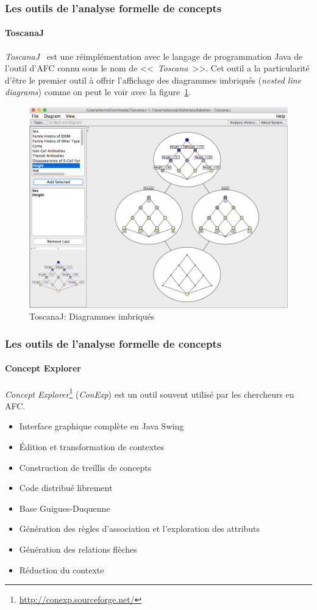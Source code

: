 \documentclass[french]{beamer}
\begin{document}
\begin{frame}
\frametitle{Les outils de l'analyse formelle de concepts}
\framesubtitle{ToscanaJ}
\emph{ToscanaJ}~\parencite{Becker2002} est une réimplémentation avec le langage de programmation Java de l'outil d'AFC connu sous le nom de <<~\emph{Toscana}~>>. Cet outil a la particularité d'être le premier outil à offrir l'affichage des diagrammes imbriqués (\emph{nested line diagrams}) comme on peut le voir avec la figure~\ref{cap:fig:toscanaj-nested}.
\begin{figure}[H]
\caption{ToscanaJ: Diagrammes imbriqués}
\label{cap:fig:toscanaj-nested}
\begin{center}\includegraphics[scale=0.17]{figures/toscanaj-nested.png}\end{center}
\end{figure}
\end{frame}
\begin{frame}
\frametitle{Les outils de l'analyse formelle de concepts}
\framesubtitle{Concept Explorer}
\emph{Concept Explorer}\footnote{\url{http://conexp.sourceforge.net/}} (\emph{ConExp}) est un outil souvent utilisé par les chercheurs en AFC.
\begin{itemize}
\item Interface graphique complète en Java Swing
\item Édition et transformation de contextes
\item Construction de treillis de concepts
\item Code distribué librement
\item Base Guigues-Duquenne
\item Génération des règles d'association et l'exploration des attributs
\item Génération des relations flèches
\item Réduction du contexte
\end{itemize}
\end{frame}
\end{document}

